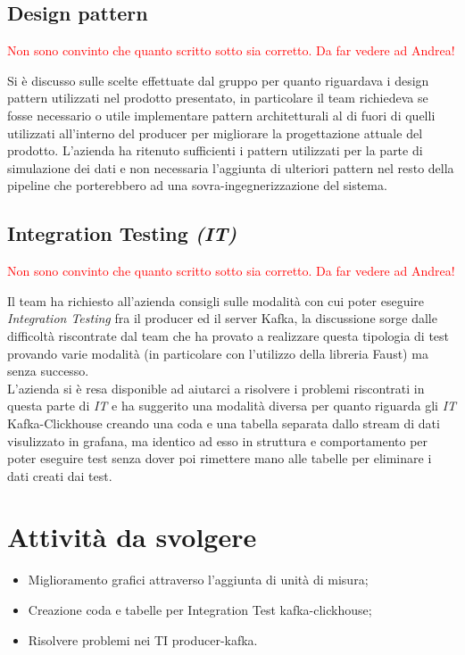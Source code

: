 \documentclass{article}
\begin{document}
    \subsection{Design pattern}
        \textcolor{red}{Non sono convinto che quanto scritto sotto sia corretto. Da far vedere ad Andrea!}

        Si è discusso sulle scelte effettuate dal gruppo per quanto riguardava i design pattern utilizzati nel prodotto presentato, in particolare il team richiedeva se fosse necessario o utile implementare pattern architetturali al di fuori di quelli utilizzati all'interno del producer per migliorare la progettazione attuale del prodotto. L'azienda ha ritenuto sufficienti i pattern utilizzati per la parte di simulazione dei dati e non necessaria l'aggiunta di ulteriori pattern nel resto della pipeline che porterebbero ad una sovra-ingegnerizzazione del sistema.  
    \subsection{Integration Testing \textit{(IT)}}
        \textcolor{red}{Non sono convinto che quanto scritto sotto sia corretto. Da far vedere ad Andrea!}

        Il team ha richiesto all'azienda consigli sulle modalità con cui poter eseguire \textit{Integration Testing} fra il producer ed il server Kafka, la discussione sorge dalle difficoltà riscontrate dal team che ha provato a realizzare questa tipologia di test provando varie modalità (in particolare con l'utilizzo della libreria Faust) ma senza successo. \\
        L'azienda si è resa disponible ad aiutarci a risolvere i problemi riscontrati in questa parte di \textit{IT} e ha suggerito una modalità diversa per quanto riguarda gli \textit{IT} Kafka-Clickhouse creando una coda e una tabella separata dallo stream di dati visulizzato in grafana, ma identico ad esso in struttura e comportamento per poter eseguire test senza dover poi rimettere mano alle tabelle per eliminare i dati creati dai test.

\section{Attività da svolgere}
    \begin{itemize}
        \item Miglioramento grafici attraverso l'aggiunta di unità di misura;
        \item Creazione coda e tabelle per Integration Test kafka-clickhouse;
        \item Risolvere problemi nei TI producer-kafka.
    \end{itemize}
\end{document}
